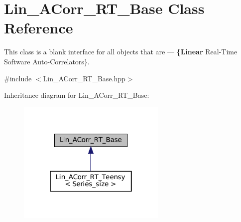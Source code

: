 \hypertarget{classLin__ACorr__RT__Base}{}\section{Lin\+\_\+\+A\+Corr\+\_\+\+R\+T\+\_\+\+Base Class Reference}
\label{classLin__ACorr__RT__Base}


This class is a blank interface for all objects that are — {\bfseries \{Linear} Real-\/\+Time Software Auto-\/\+Correlators\}.  




{\ttfamily \#include $<$Lin\+\_\+\+A\+Corr\+\_\+\+R\+T\+\_\+\+Base.\+hpp$>$}



Inheritance diagram for Lin\+\_\+\+A\+Corr\+\_\+\+R\+T\+\_\+\+Base\+:
\nopagebreak
\begin{figure}[H]
\begin{center}
\leavevmode
\includegraphics[width=202pt]{classLin__ACorr__RT__Base__inherit__graph}
\end{center}
\end{figure}
